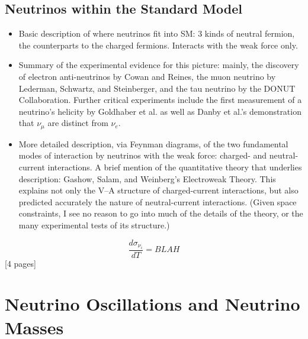 {\subsection{Neutrinos within the Standard Model}
\begin{itemize}
    \item Basic description of where neutrinos fit into SM: 3 kinds of neutral fermion, the counterparts to the charged fermions. Interacts with the weak force only.
    \item Summary of the experimental evidence for this picture: mainly, the discovery of electron anti-neutrinos by Cowan and Reines, the muon neutrino by Lederman, Schwartz, and Steinberger, and the tau neutrino by the DONUT Collaboration. Further critical experiments include the first measurement of a neutrino's helicity by Goldhaber et al. as well as Danby et al.'s demonstration that $\nu_{\mu}$ are distinct from $\nu_{e}$.
    \item More detailed description, via Feynman diagrams, of the two fundamental modes of interaction by neutrinos with the weak force: charged- and neutral-current interactions. A brief mention of the quantitative theory that underlies description: Gashow, Salam, and Weinberg's Electroweak Theory. This explains not only the V--A structure of charged-current interactions, but also predicted accurately the nature of neutral-current interactions. (Given space constraints, I see no reason to go into much of the details of the theory, or the many experimental tests of its structure.)
\end{itemize}
\begin{equation}\label{eq:enu_es_xsec}
    \frac{d\sigma_{\nu_{i}}}{dT} = BLAH
\end{equation}
[4 pages]
\section{Neutrino Oscillations and Neutrino Masses}
}
